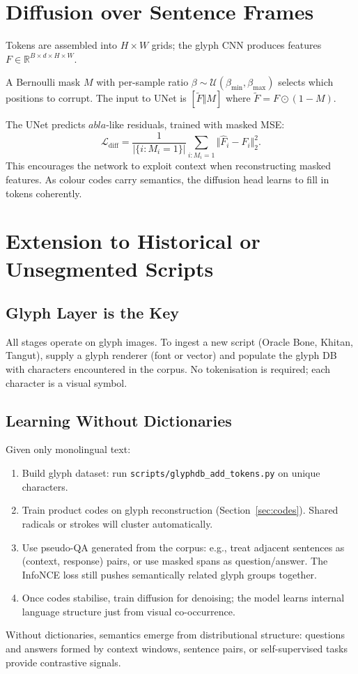 \documentclass[11pt]{article}
\begin{document}
\section{Diffusion over Sentence Frames}
Tokens are assembled into $H\times W$ grids; the glyph CNN produces features $F\in\mathbb{R}^{B\times d\times H\times W}$.

A Bernoulli mask $M$ with per-sample ratio $\beta\sim\mathcal{U}(\beta_{\min},\beta_{\max})$ selects which positions to corrupt. The input to UNet is $[\tilde{F} \Vert M]$ where $\tilde{F}=F\odot(1-M)$.

The UNet predicts $
abla$-like residuals, trained with masked MSE:
\begin{equation}
    \mathcal{L}_{\text{diff}} = \frac{1}{|\{i:M_i=1\}|}\sum_{i:M_i=1} \Vert \hat{F}_i - F_i\Vert_2^2.
\end{equation}
This encourages the network to exploit context when reconstructing masked features. As colour codes carry semantics, the diffusion head learns to fill in tokens coherently.

\section{Extension to Historical or Unsegmented Scripts}
\subsection{Glyph Layer is the Key}
All stages operate on glyph images. To ingest a new script (Oracle Bone, Khitan, Tangut), supply a glyph renderer (font or vector) and populate the glyph DB with characters encountered in the corpus. No tokenisation is required; each character is a visual symbol.

\subsection{Learning Without Dictionaries}
Given only monolingual text:
\begin{enumerate}
    \item Build glyph dataset: run \texttt{scripts/glyphdb\_add\_tokens.py} on unique characters.
    \item Train product codes on glyph reconstruction (Section~\ref{sec:codes}). Shared radicals or strokes will cluster automatically.
    \item Use pseudo-QA generated from the corpus: e.g., treat adjacent sentences as (context, response) pairs, or use masked spans as question/answer. The InfoNCE loss still pushes semantically related glyph groups together.
    \item Once codes stabilise, train diffusion for denoising; the model learns internal language structure just from visual co-occurrence.
\end{enumerate}
Without dictionaries, semantics emerge from distributional structure: questions and answers formed by context windows, sentence pairs, or self-supervised tasks provide contrastive signals.
\end{document}
